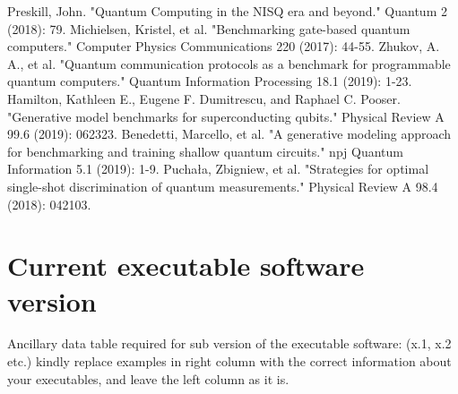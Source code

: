 \documentclass[preprint,12pt, a4paper]{elsarticle}
\newcommand{\1}{{\rm 1\hspace{-0.9mm}l}}
\begin{document}


%
%   
%  


\begin{thebibliography}{00}

 Preskill, John. "Quantum Computing in the NISQ era and 
beyond." Quantum 2 (2018): 79.
 Michielsen, Kristel, et al. "Benchmarking 
gate-based quantum computers." Computer Physics Communications 220 (2017): 
44-55.
 Zhukov, A. A., et al. "Quantum communication 
protocols as a benchmark for programmable quantum computers." Quantum 
Information Processing 18.1 (2019): 1-23.
 Hamilton, Kathleen E., Eugene F. Dumitrescu, 
and Raphael C. Pooser. "Generative model benchmarks for superconducting 
qubits." Physical Review A 99.6 (2019): 062323.
 Benedetti, Marcello, et al. "A generative 
modeling approach for benchmarking and training shallow quantum circuits." npj 
Quantum Information 5.1 (2019): 1-9.
 Puchała, Zbigniew, et al. "Strategies for 
optimal single-shot discrimination of quantum measurements." Physical Review A 
98.4 (2018): 042103.
\end{thebibliography}

\section*{Current executable software version}
\label{}

Ancillary data table required for sub version of the executable software: (x.1, 
x.2 etc.) kindly replace examples in right column with the correct information 
about your executables, and leave the left column as it is.
\end{document}
